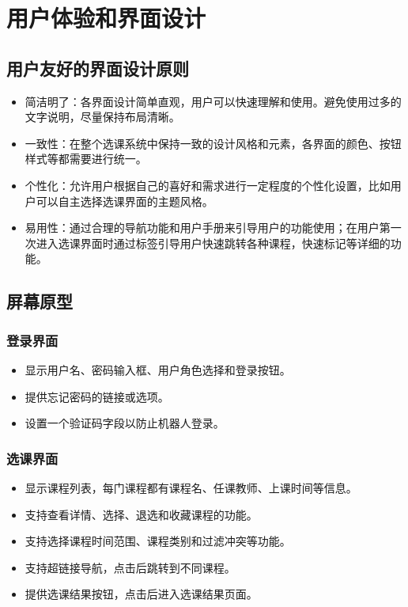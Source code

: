 \documentclass{article}
\begin{document}
\section{用户体验和界面设计}
\subsection{用户友好的界面设计原则}
\begin{itemize}
	\item 简洁明了：各界面设计简单直观，用户可以快速理解和使用。避免使用过多的文字说明，尽量保持布局清晰。
	\item 一致性：在整个选课系统中保持一致的设计风格和元素，各界面的颜色、按钮样式等都需要进行统一。
	\item 个性化：允许用户根据自己的喜好和需求进行一定程度的个性化设置，比如用户可以自主选择选课界面的主题风格。
	\item 易用性：通过合理的导航功能和用户手册来引导用户的功能使用；在用户第一次进入选课界面时通过标签引导用户快速跳转各种课程，快速标记等详细的功能。
\end{itemize}

\subsection{屏幕原型}
\subsubsection{登录界面}
\begin{itemize}
	\item 显示用户名、密码输入框、用户角色选择和登录按钮。
	\item 提供忘记密码的链接或选项。
	\item 设置一个验证码字段以防止机器人登录。
\end{itemize}

\subsubsection{选课界面}
\begin{itemize}
	\item 显示课程列表，每门课程都有课程名、任课教师、上课时间等信息。
	\item 支持查看详情、选择、退选和收藏课程的功能。
	\item 支持选择课程时间范围、课程类别和过滤冲突等功能。
	\item 支持超链接导航，点击后跳转到不同课程。
	\item 提供选课结果按钮，点击后进入选课结果页面。
\end{itemize}
\end{document}
